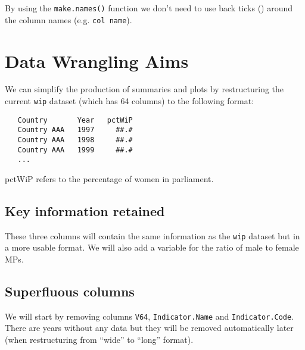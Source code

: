 \documentclass[a4paper,9pt,twocolumn,twoside,printwatermark=false]{pinp}
\begin{document}
By using the \texttt{make.names()} function we don't need to use back
ticks (\texttt{\textasciigrave{}}) around the column names (e.g.
\texttt{\textasciigrave{}col\ name\textasciigrave{}}).

\begin{Shaded}
\begin{Highlighting}[]
\StringTok{ }\NormalTok{(}
\NormalTok{(}
\NormalTok{(}
\end{Highlighting}
\end{Shaded}

\section{Data Wrangling Aims}\label{data-wrangling-aims}

We can simplify the production of summaries and plots by restructuring
the current \texttt{wip} dataset (which has 64 columns) to the following
format:

\begin{verbatim}
   Country       Year   pctWiP
   Country AAA   1997     ##.#
   Country AAA   1998     ##.#
   Country AAA   1999     ##.#
   ...
\end{verbatim}

pctWiP refers to the percentage of women in parliament.

\subsection{Key information retained}\label{key-information-retained}

These three columns will contain the same information as the
\texttt{wip} dataset but in a more usable format. We will also add a
variable for the ratio of male to female MPs.

\subsection{Superfluous columns}\label{superfluous-columns}

We will start by removing columns \texttt{V64}, \texttt{Indicator.Name}
and \texttt{Indicator.Code}. There are years without any data but they
will be removed automatically later (when restructuring from ``wide'' to
``long'' format).
\end{document}
